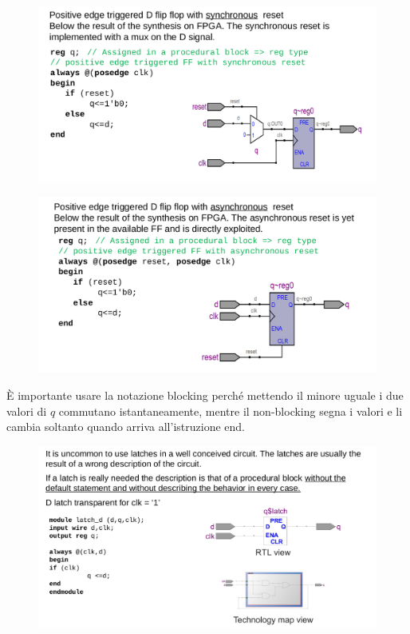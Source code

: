 \documentclass{book}
\begin{document}
        \begin{figure}[h!]
            \centering
            \includegraphics[width=0.75\linewidth]{img/chapt11img3.png}
        \end{figure}
        \begin{figure}[h!]
            \centering
            \includegraphics[width=0.75\linewidth]{img/chapt11img4.png}
        \end{figure} \newpage
        È importante usare la notazione blocking perché mettendo il minore uguale i due valori di $q$ commutano istantaneamente, mentre il non-blocking segna i valori e li cambia soltanto quando arriva all'istruzione end.
        \begin{figure}[h!]
            \centering
            \includegraphics[width=0.75\linewidth]{img/Chapt11img5.png}
        \end{figure}
\end{document}
